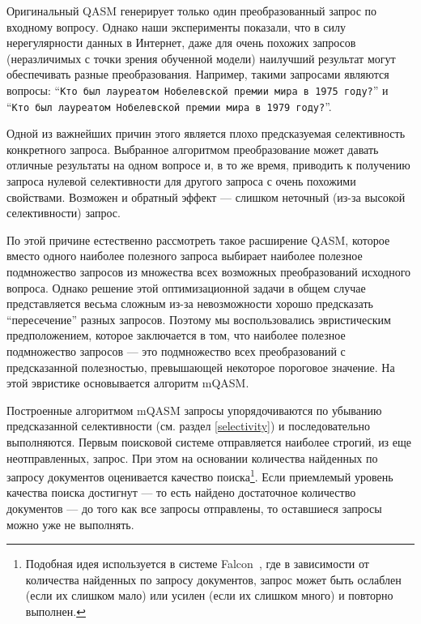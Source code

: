 \documentclass{article}
\newcommand{\query}[1]{``{\textrm{\tt #1}}''}
\begin{document}
Оригинальный QASM генерирует только один преобразованный запрос по входному вопросу.
Однако наши эксперименты показали,
что в силу нерегулярности данных в Интернет, даже для очень похожих запросов 
(неразличимых с точки зрения обученной модели) наилучший результат
могут обеспечивать разные преобразования. 
Например, такими запросами 
являются вопросы:
\query{Кто был лауреатом Нобелевской премии мира в 1975 году?} и 
\query{Кто был лауреатом Нобелевской премии мира в 1979 году?}.

Одной из важнейших причин этого является плохо предсказуемая селективность
конкретного запроса.
Выбранное алгоритмом преобразование
может давать отличные результаты на
одном вопросе и, в то же время, приводить к получению запроса нулевой
селективности для другого запроса с очень похожими свойствами.
Возможен и обратный эффект --- слишком неточный (из-за высокой селективности) запрос.

По этой причине естественно рассмотреть такое расширение QASM, %
которое вместо одного наиболее полезного запроса 
выбирает наиболее полезное подмножество запросов из
множества всех возможных преобразований исходного вопроса.
Однако решение этой оптимизационной задачи в общем случае представляется весьма
сложным из-за невозможности хорошо предсказать ``пересечение'' разных запросов.
Поэтому мы воспользовались эвристическим предположением, которое заключается в том,
что наиболее полезное подмножество запросов --- это подмножество всех преобразований
с предсказанной полезностью, превышающей некоторое пороговое значение.
На этой эвристике основывается алгоритм mQASM.

Построенные алгоритмом mQASM запросы
упорядочиваются по убыванию предсказанной селективности (см. раздел \ref{selectivity})
и последовательно выполняются.
Первым поисковой системе отправляется наиболее строгий, из еще неотправленных, запрос.
При этом на основании количества найденных по запросу документов оценивается качество поиска\footnote{
Подобная идея используется в системе Falcon~\cite{qa:Harabagiu}, 
где в зависимости от количества найденных по запросу документов,
запрос может быть ослаблен (если их слишком мало)
или усилен (если их слишком много) и повторно выполнен.}.
Если приемлемый уровень качества поиска достигнут --- то есть найдено достаточное количество документов ---
до того как все запросы отправлены, то
оставшиеся запросы можно уже не выполнять.
\end{document}

